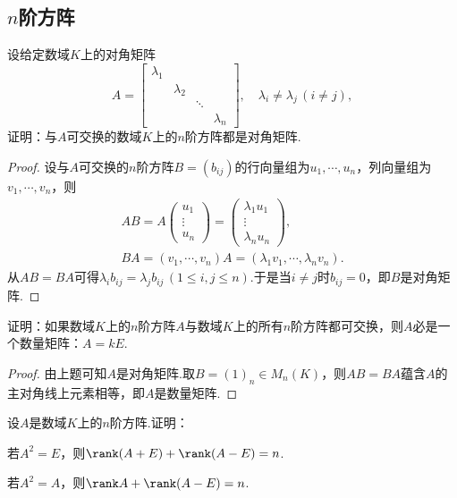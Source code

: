 \subsection{\texorpdfstring{$n$}{n}阶方阵}
\begin{prob}[5]
	设给定数域$K$上的对角矩阵
	\[
		A=\begin{bmatrix}
			\lambda_1 &           &        &           \\
			          & \lambda_2 &        &           \\
			          &           & \ddots &           \\
			          &           &        & \lambda_n
		\end{bmatrix},\quad \lambda_i\ne\lambda_j\,(i\ne j),
	\]
	证明：与$A$可交换的数域$K$上的$n$阶方阵都是对角矩阵.
\end{prob}
\begin{proof}
	设与$A$可交换的$n$阶方阵$B=(b_{ij})$的行向量组为$u_1,\cdots,u_n$，列向量组为$v_1,\cdots,v_n$，则
	\begin{gather*}
		AB=A\begin{pmatrix}
			u_1 \\\vdots\\u_n
		\end{pmatrix}=\begin{pmatrix}
			\lambda_1u_1 \\\vdots\\\lambda_nu_n
		\end{pmatrix},\\
		BA=(v_1,\cdots,v_n)A=(\lambda_1v_1,\cdots,\lambda_nv_n).
	\end{gather*}
	从$AB=BA$可得$\lambda_ib_{ij}=\lambda_jb_{ij}\,(1\le i,j\le n)$.于是当$i\ne j$时$b_{ij}=0$，即$B$是对角矩阵.
\end{proof}
\begin{prob}[6]
	证明：如果数域$K$上的$n$阶方阵$A$与数域$K$上的所有$n$阶方阵都可交换，则$A$必是一个数量矩阵：$A=kE$.
\end{prob}
\begin{proof}
	由上题可知$A$是对角矩阵.取$B=(1)_n\in M_n(K)$，则$AB=BA$蕴含$A$的主对角线上元素相等，即$A$是数量矩阵.
\end{proof}
\begin{prob}[7]
	设$A$是数域$K$上的$n$阶方阵.证明：
	\begin{mylist}
		\item 若$A^2=E$，则$\rank(A+E)+\rank(A-E)=n$.
		\item 若$A^2=A$，则$\rank A+\rank(A-E)=n$.
	\end{mylist}
\end{prob}
